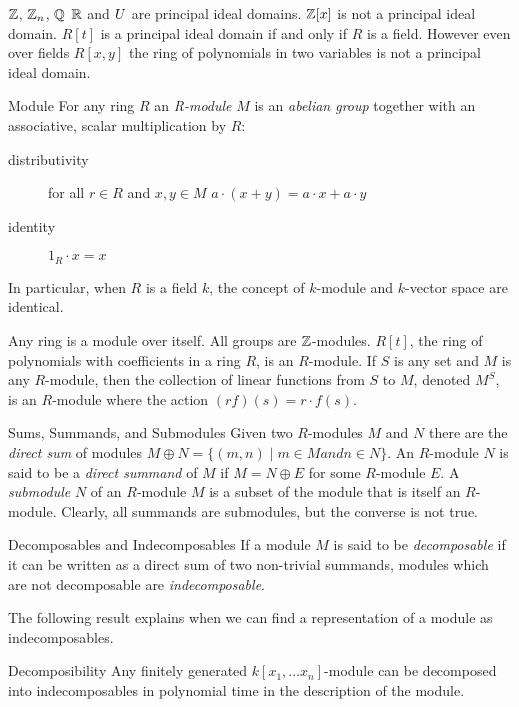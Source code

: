 \begin{example}
$\mathbb{Z}$, $\mathbb{Z}_n$, $\mathbb{Q}$ $\mathbb{R}$ and $U$ are principal ideal domains. $\mathbb{Z}[x]$ is not a principal ideal domain. $R[t]$ is a principal ideal domain if and only if $R$ is a field. However
even over fields $R[x,y]$ the ring of polynomials in two variables is not a principal ideal domain.
\end{example}
\begin{definition}{Module}
For any ring $R$ an \emph{R-module} $M$ is an \emph{abelian group} together with an associative, scalar multiplication by $R$: 
\begin{description}
\item[distributivity] for all $r \in R$ and $x,y \in M$ $a \cdot (x + y)  = a \cdot x + a \cdot y$
\item[identity] $1_R \cdot x = x$
\end{description}
\end{definition}
In particular, when $R$ is a field $k$, the concept of $k$-module and $k$-vector space are identical.
\begin{example}
Any ring is a module over itself.  All groups are $\mathbb{Z}$-modules. $R[t]$, the ring of polynomials with coefficients in a ring $R$, is an $R$-module. If $S$ is any set and $M$ is any $R$-module, then the collection of linear functions from $S$ to $M$, denoted $M^S$, is an $R$-module where the action $(rf)(s) =  r \cdot f(s)$.
\end{example}
\begin{definition}{Sums, Summands, and Submodules}
Given two $R$-modules $M$ and $N$ there are the \emph{direct sum} of modules $M \oplus N = \{ (m,n) \mid m \in M and n \in N \}$.
An $R$-module $N$ is said to be a \emph{direct summand} of $M$ if $M = N \oplus E$ for some $R$-module $E$. 
A \emph{submodule} $N$ of an $R$-module $M$ is a subset of the module that is itself an $R$-module. Clearly, all summands are submodules, but the converse is not true.
\end{definition}
\begin{definition}{Decomposables and Indecomposables}
If a module $M$ is said to be \emph{decomposable} if it can be written as a direct sum of two non-trivial summands, modules which are not decomposable are \emph{indecomposable}. 
\end{definition}
The following result explains when we can find a representation of a module as indecomposables.
\begin{theorem}{Decomposibility}
Any finitely generated $k[x_1, \ldots x_n]$-module can be decomposed into indecomposables in polynomial time in the description of the module. 
\end{theorem}
